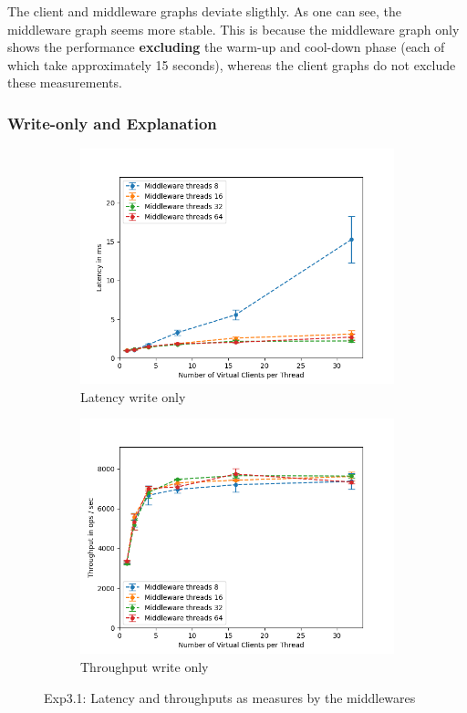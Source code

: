 \documentclass[11pt,a4paper]{article}
\begin{document}
The client and middleware graphs deviate sligthly.
As one can see, the middleware graph seems more stable.
This is because the middleware graph only shows the performance \textbf{excluding} the warm-up and cool-down phase (each of which take approximately 15 seconds), whereas the client graphs do not exclude these measurements.

\subsubsection{Write-only and Explanation}

\begin{figure}[H]
\centering
\begin{subfigure}{.5\textwidth}
    \centering
    \includegraphics[width=\textwidth]{img/exp3_1/exp3_1__latency_middleware_write_1.png}
    \caption{Latency write only}
    \label{fig:mesh1}
\end{subfigure}%
\begin{subfigure}{.5\textwidth}
      \centering
    \includegraphics[width=\textwidth]{img/exp3_1/exp3_1__throughput_middleware_write_1.png}
    \caption{Throughput write only}
    \label{fig:mesh1}
\end{subfigure}
\caption{Exp3.1: Latency and throughputs as measures by the middlewares}
\label{fig:test}
\end{figure}
\end{document}
